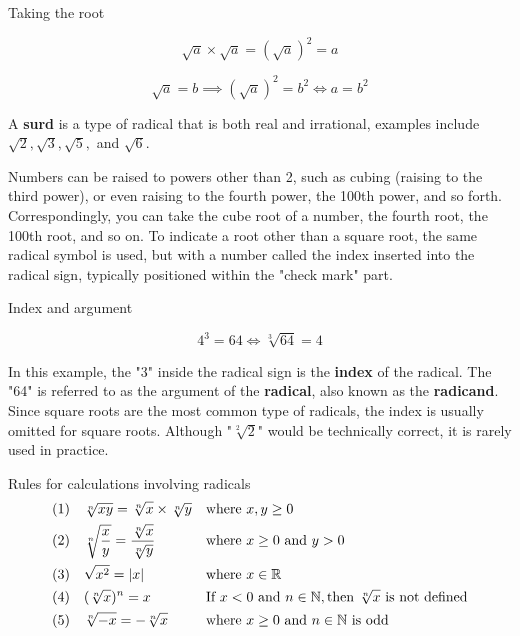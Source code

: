 \begin{example} Taking the root

\[
\sqrt{a} \times \sqrt{a} = (\sqrt{a})^2 = a
\]

\[
\sqrt{a} = b \implies (\sqrt{a})^2 = b^2 \iff a = b^2
\]    
\end{example}



A \textbf{surd} is a type of radical that is both real and irrational, examples include \(\sqrt{2}, \sqrt{3}, \sqrt{5},\) and \(\sqrt{6}\).

Numbers can be raised to powers other than 2, such as cubing (raising to the third power), or even raising to the fourth power, the 100th power, and so forth. Correspondingly, you can take the cube root of a number, the fourth root, the 100th root, and so on. To indicate a root other than a square root, the same radical symbol is used, but with a number called the index inserted into the radical sign, typically positioned within the "check mark" part.

\begin{example} Index and argument

\[
4^3 = 64 \iff \sqrt[3]{64} = 4
\]
   
\end{example}

In this example, the "3" inside the radical sign is the \textbf{index} of the radical. The "64" is referred to as the argument of the \textbf{radical}, also known as the \textbf{radicand}. Since square roots are the most common type of radicals, the index is usually omitted for square roots. Although "\(\sqrt[2]{2}\)" would be technically correct, it is rarely used in practice.
\begin{proposition}{Rules for calculations involving radicals}
    \begin{align*}
    &(1) \quad \sqrt[n]{x y}=\sqrt[n]{x} \times \sqrt[n]{y}   &   &\textnormal{where } x,y \geq 0\\
    &(2) \quad \sqrt[n]{\frac{x}{y}} = \frac{\sqrt[n]{x}}{\sqrt[n]{y}}    &   &\textnormal{where } x \geq 0 \textnormal{ and } y > 0 \\
    &(3) \quad \sqrt{x^2} = |x|   &   &\textnormal{where } x \in \mathbb{R} \\
    &(4) \quad (\sqrt[n]{x})^n = x    &   &\textnormal{If } x < 0 \textnormal{ and } n \in \mathbb{N}, \textnormal{then } \sqrt[n]{x} \textnormal{ is not defined}\\
    &(5) \quad \sqrt[n]{-x}=-\sqrt[n]{x}  &   &\textnormal{where } x \geq 0 \textnormal{ and } n \in \mathbb{N} \textnormal{ is odd }
    \end{align*}
\end{proposition}

